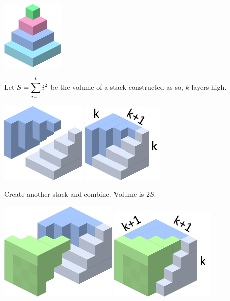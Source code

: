 \documentclass[letterpaper,fleqn,leqno]{article}
\begin{document}
\begin{enumerate}[(a)]
\begin{enumerate}
			\begin{minipage}{0.2\textwidth}
				\includegraphics{stack}
			\end{minipage}
			 Let $S=\displaystyle\sum\limits_{i=1}^{k}i^2$ be the volume of a stack constructed as so, $k$ layers high. \\
			 \begin{minipage}{0.4\textwidth}
			 	\includegraphics[scale=0.5]{stack 2}
			 	\includegraphics[scale=0.7]{stack 2 2}
			 \end{minipage}
			 Create another stack and combine. Volume is $2S$. \\
			 \begin{minipage}{0.4\textwidth}
			 	\includegraphics[scale=0.4]{stack 3}
			 	\includegraphics[scale=0.55]{stack 3 2}

\end{minipage}
\end{enumerate}
\end{enumerate}
\end{document}
